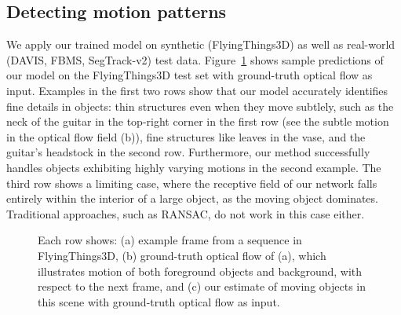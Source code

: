 \subsection{Detecting motion patterns}
\label{sec:realvid}
We apply our trained model on synthetic (FlyingThings3D) as well as real-world
(DAVIS, FBMS, SegTrack-v2) test data. Figure~\ref{fig:qualff} shows sample
predictions of our model on the FlyingThings3D test set with ground-truth
optical flow as input. Examples in the first two rows show that our model
accurately identifies fine details in objects: thin structures even when they
move subtlely, such as the neck of the guitar in the top-right corner in the
first row (see the subtle motion in the optical flow field (b)), fine
structures like leaves in the vase, and the guitar's headstock in the second
row.  Furthermore, our method successfully handles objects exhibiting highly
varying motions in the second example. The third row shows a limiting case,
where the receptive field of our network falls entirely within the interior of
a large object, as the moving object dominates. Traditional approaches, such as
RANSAC, do not work in this case either.
\begin{figure}[t]
\begin{center}
 \vspace{0.1cm}
 \vspace{0.1cm}
\end{center}
\vspace{-0.3cm}\caption{Each row shows: (a) example frame from a sequence in
FlyingThings3D, (b) ground-truth optical flow of (a), which illustrates motion
of both foreground objects and background, with respect to the next frame, and
(c) our estimate of moving objects in this scene with ground-truth optical flow
as input.}
\label{fig:qualff}
\end{figure}

